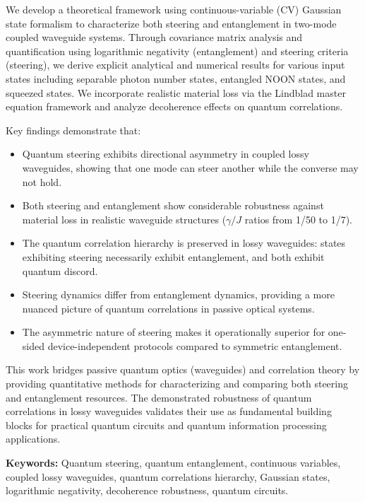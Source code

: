\documentclass[12pt,a4paper]{report}
\begin{document}
We develop a theoretical framework using continuous-variable (CV) Gaussian state formalism to characterize both steering and entanglement in two-mode coupled waveguide systems. Through covariance matrix analysis and quantification using logarithmic negativity (entanglement) and steering criteria (steering), we derive explicit analytical and numerical results for various input states including separable photon number states, entangled NOON states, and squeezed states. We incorporate realistic material loss via the Lindblad master equation framework and analyze decoherence effects on quantum correlations.

Key findings demonstrate that:
\begin{itemize}
	\item Quantum steering exhibits directional asymmetry in coupled lossy waveguides, showing that one mode can steer another while the converse may not hold.
	\item Both steering and entanglement show considerable robustness against material loss in realistic waveguide structures ($\gamma/J$ ratios from 1/50 to 1/7).
	\item The quantum correlation hierarchy is preserved in lossy waveguides: states exhibiting steering necessarily exhibit entanglement, and both exhibit quantum discord.
	\item Steering dynamics differ from entanglement dynamics, providing a more nuanced picture of quantum correlations in passive optical systems.
	\item The asymmetric nature of steering makes it operationally superior for one-sided device-independent protocols compared to symmetric entanglement.
\end{itemize}

This work bridges passive quantum optics (waveguides) and correlation theory by providing quantitative methods for characterizing and comparing both steering and entanglement resources. The demonstrated robustness of quantum correlations in lossy waveguides validates their use as fundamental building blocks for practical quantum circuits and quantum information processing applications.

\textbf{Keywords:} Quantum steering, quantum entanglement, continuous variables, coupled lossy waveguides, quantum correlations hierarchy, Gaussian states, logarithmic negativity, decoherence robustness, quantum circuits.

\newpage

\end{document}
